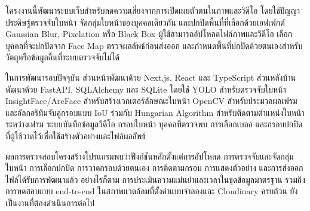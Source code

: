 โครงงานนี้พัฒนาระบบเว็บสำหรับลดความเสี่ยงจากการเปิดเผยตัวตนในภาพและวิดีโอ โดยใช้ปัญญาประดิษฐ์ตรวจจับใบหน้า จัดกลุ่มใบหน้าของบุคคลเดียวกัน และปกปิดพื้นที่ที่เลือกด้วยเอฟเฟกต์ Gaussian Blur, Pixelation หรือ Black Box ผู้ใช้สามารถอัปโหลดไฟล์ภาพและวิดีโอ เลือกบุคคลที่จะปกปิดจาก Face Map ตรวจผลลัพธ์ก่อนส่งออก และกำหนดพื้นที่ปกปิดด้วยตนเองสำหรับวัตถุหรือข้อมูลอื่นที่ระบบตรวจจับไม่ได้

ในการพัฒนารอบปัจจุบัน ส่วนหน้าพัฒนาด้วย Next.js, React และ TypeScript ส่วนหลังบ้านพัฒนาด้วย FastAPI, SQLAlchemy และ SQLite โดยใช้ YOLO สำหรับตรวจจับใบหน้า InsightFace/ArcFace สำหรับสร้างเวกเตอร์ลักษณะใบหน้า OpenCV สำหรับประมวลผลเฟรม และอัลกอริทึมจับคู่กรอบแบบ IoU ร่วมกับ Hungarian Algorithm สำหรับติดตามตำแหน่งใบหน้าระหว่างเฟรม ระบบบันทึกข้อมูลวิดีโอ กรอบใบหน้า บุคคลที่ตรวจพบ การเลือกเบลอ และกรอบปกปิดที่ผู้ใช้วาดไว้เพื่อใช้สร้างตัวอย่างและไฟล์ผลลัพธ์

ผลการตรวจสอบโครงสร้างโปรแกรมพบว่าฟังก์ชันหลักตั้งแต่การอัปโหลด การตรวจจับและจัดกลุ่มใบหน้า การเลือกปกปิด การวาดกรอบด้วยตนเอง การติดตามกรอบ การแสดงตัวอย่าง และการส่งออกไฟล์ได้รับการพัฒนาแล้ว อย่างไรก็ตาม การประเมินความแม่นยำและเวลาในชุดข้อมูลมาตรฐาน รวมถึงการทดสอบแบบ end-to-end ในสภาพแวดล้อมที่ตั้งค่าแบบจำลองและ Cloudinary ครบถ้วน ยังเป็นงานที่ต้องดำเนินการต่อไป
